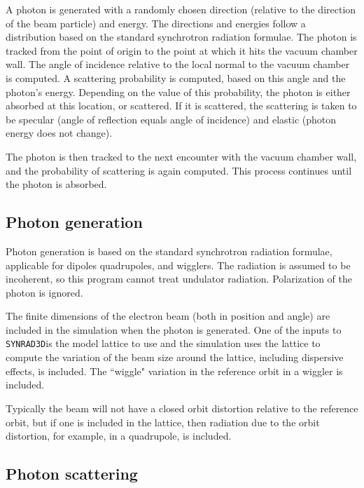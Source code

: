 \documentclass[11pt,landscape]{article}
\newcommand{\srthree}{\texttt{SYNRAD3D}}
\begin{document}
A photon is generated with a randomly chosen direction (relative to
the direction of the beam particle) and energy. The directions and
energies follow a distribution based on the standard synchrotron
radiation formulae. The photon is tracked from the point of origin to
the point at which it hits the vacuum chamber wall. The angle of
incidence relative to the local normal to the vacuum chamber is
computed. A scattering probability is computed, based on this angle
and the photon's energy. Depending on the value of this probability,
the photon is either absorbed at this location, or scattered. If it is
scattered, the scattering is taken to be specular (angle of reflection
equals angle of incidence) and elastic (photon energy does not
change).

The photon is then tracked to the next encounter with the vacuum
chamber wall, and the probability of scattering is again
computed. This process continues until the photon is absorbed.

\subsection{Photon generation}

Photon generation is based on the standard synchrotron radiation
formulae, applicable for dipoles quadrupoles, and wigglers. The
radiation is assumed to be incoherent, so this program cannot treat
undulator radiation. Polarization of the photon is ignored.

The finite dimensions of the electron beam (both in position and
angle) are included in the simulation when the photon is
generated. One of the inputs to \srthree is the model lattice
to use and the simulation uses the lattice to compute the
variation of the beam size around the lattice, including dispersive
effects, is included. The ``wiggle" variation in the reference orbit
in a wiggler is included.

Typically the beam will not have a closed orbit distortion relative to
the reference orbit, but if one is included in the lattice, then
radiation due to the orbit distortion, for example, in a quadrupole,
is included.  

\subsection{Photon scattering} 
\end{document}
